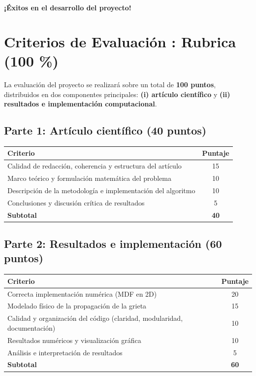 \documentclass[a4paper,10pt]{exam}
\begin{document}
\begin{center}
\Large \textbf{¡Éxitos en el desarrollo del proyecto!}
\end{center}


\section*{Criterios de Evaluación : Rubrica (100 \%)}

La evaluación del proyecto se realizará sobre un total de \textbf{100 puntos}, distribuidos en dos componentes principales: \textbf{(i) artículo científico} y \textbf{(ii) resultados e implementación computacional}.

\subsection*{Parte 1: Artículo científico (40 puntos)}

\begin{center}
\begin{tabular}{|l|c|}
\hline
\textbf{Criterio} & \textbf{Puntaje} \\
\hline
Calidad de redacción, coherencia y estructura del artículo & 15 \\
Marco teórico y formulación matemática del problema & 10 \\
Descripción de la metodología e implementación del algoritmo & 10 \\
Conclusiones y discusión crítica de resultados & 5 \\
\hline
\textbf{Subtotal} & \textbf{40} \\
\hline
\end{tabular}
\end{center}

\subsection*{Parte 2: Resultados e implementación (60 puntos)}

\begin{center}
\begin{tabular}{|l|c|}
\hline
\textbf{Criterio} & \textbf{Puntaje} \\
\hline
Correcta implementación numérica (MDF en 2D) & 20 \\
Modelado físico de la propagación de la grieta & 15 \\
Calidad y organización del código (claridad, modularidad, documentación) & 10 \\
Resultados numéricos y visualización gráfica & 10 \\
Análisis e interpretación de resultados & 5 \\
\hline
\textbf{Subtotal} & \textbf{60} \\
\hline
\end{tabular}
\end{center}
\end{document}
